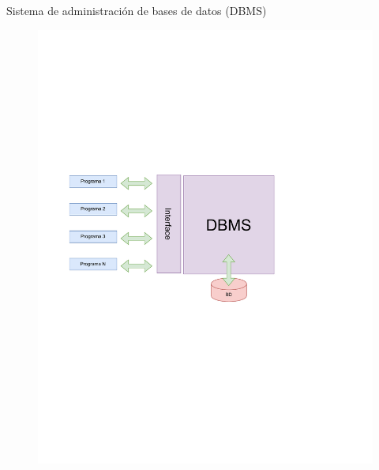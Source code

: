 \documentclass{beamer}
\begin{document}
\begin{frame}{Sistema de administración de bases de datos (DBMS)}
{\begin{figure}
    \includegraphics[scale=0.5]{img/file_systemdbms.pdf}
 \end{figure}


} 

  \end{frame} 
 
 
 
\end{document}
